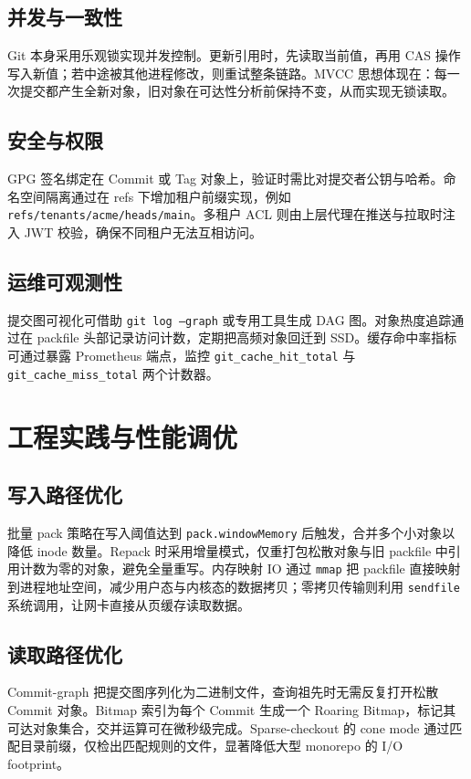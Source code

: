 \section{并发与一致性}
Git 本身采用乐观锁实现并发控制。更新引用时，先读取当前值，再用 CAS 操作写入新值；若中途被其他进程修改，则重试整条链路。MVCC 思想体现在：每一次提交都产生全新对象，旧对象在可达性分析前保持不变，从而实现无锁读取。\par
\section{安全与权限}
GPG 签名绑定在 Commit 或 Tag 对象上，验证时需比对提交者公钥与哈希。命名空间隔离通过在 refs 下增加租户前缀实现，例如 \texttt{refs/tenants/acme/heads/main}。多租户 ACL 则由上层代理在推送与拉取时注入 JWT 校验，确保不同租户无法互相访问。\par
\section{运维可观测性}
提交图可视化可借助 \texttt{git log --graph} 或专用工具生成 DAG 图。对象热度追踪通过在 packfile 头部记录访问计数，定期把高频对象回迁到 SSD。缓存命中率指标可通过暴露 Prometheus 端点，监控 \texttt{git\_{}cache\_{}hit\_{}total} 与 \texttt{git\_{}cache\_{}miss\_{}total} 两个计数器。\par
\chapter{工程实践与性能调优}
\section{写入路径优化}
批量 pack 策略在写入阈值达到 \texttt{pack.windowMemory} 后触发，合并多个小对象以降低 inode 数量。Repack 时采用增量模式，仅重打包松散对象与旧 packfile 中引用计数为零的对象，避免全量重写。内存映射 IO 通过 \texttt{mmap} 把 packfile 直接映射到进程地址空间，减少用户态与内核态的数据拷贝；零拷贝传输则利用 \texttt{sendfile} 系统调用，让网卡直接从页缓存读取数据。\par
\section{读取路径优化}
Commit-graph 把提交图序列化为二进制文件，查询祖先时无需反复打开松散 Commit 对象。Bitmap 索引为每个 Commit 生成一个 Roaring Bitmap，标记其可达对象集合，交并运算可在微秒级完成。Sparse-checkout 的 cone mode 通过匹配目录前缀，仅检出匹配规则的文件，显著降低大型 monorepo 的 I/O  footprint。\par

